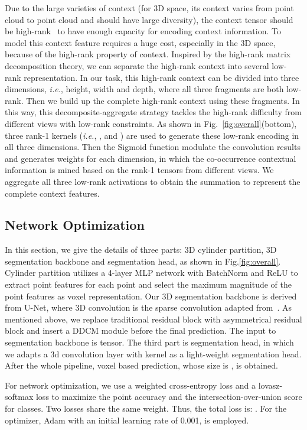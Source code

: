 \documentclass{article}
\def\ie{\emph{i.e.}}
\begin{document}
Due to the large varieties of context (for 3D space, its context varies from point cloud to point cloud and should have large diversity), the context tensor should be high-rank~\cite{zhang2019co,wanli2020} to have enough capacity for encoding context information. To model this context feature requires a huge cost, especially in the 3D space, because of the high-rank property of context. Inspired by the high-rank matrix decomposition theory, we can separate the high-rank context into several low-rank representation. In our task, this high-rank context can be divided into three dimensions, \ie, height, width and depth, where all three fragments are both low-rank.
Then we build up the complete high-rank context using these fragments. In this way, this decomposite-aggregate strategy tackles the high-rank difficulty from different views with low-rank constraints. As shown in Fig.~\ref{fig:overall}(bottom), three rank-1 kernels (\ie, ,  and ) are used to generate these low-rank encoding in all three dimensions. Then the Sigmoid function modulate the convolution results and generates weights for each dimension, in which the co-occurrence contextual information is mined based on the rank-1 tensors from different views. We aggregate all three low-rank activations to obtain the summation to represent the complete context features.

\subsection{Network Optimization}

In this section, we give the details of three parts: 3D cylinder partition, 3D segmentation backbone and segmentation head, as shown in Fig.\ref{fig:overall}. 
Cylinder partition utilizes a 4-layer MLP network with BatchNorm and ReLU to extract point features for each point and select the maximum magnitude of the point features as voxel representation. Our 3D segmentation backbone is derived from U-Net, where 3D convolution is the sparse convolution adapted from~\cite{yan2018second}. As mentioned above, we replace traditional residual block with asymmetrical residual block and insert a DDCM module before the final prediction. The input to segmentation backbone is  tensor. The third part is segmentation head, in which we adapts a 3d convolution layer with  kernel as a light-weight segmentation head. After the whole pipeline, voxel based prediction, whose size is , is obtained. 

For network optimization, we use a weighted cross-entropy loss  and a lovasz-softmax\citep{berman2018lovasz} loss to maximize the point accuracy and the intersection-over-union score for classes. Two losses share the same weight. Thus, the total loss is: . For the optimizer, Adam with an initial learning rate of 0.001, is employed.
\end{document}

